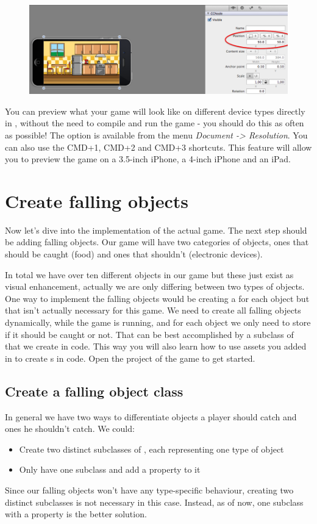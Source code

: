 \begin{figure}[H]
		\centering
		\includegraphics[width=0.9\linewidth]{images/Chapter2/center_background.png}
\end{figure}

You can preview what your game will look like on different device types directly
in \SB{}, without the need to compile and run the game - you should do this as
often as possible! The option is available from the menu \textit{Document ->
Resolution}. You can also use the CMD+1, CMD+2 and CMD+3 shortcuts. This feature
will allow you to preview the game on a 3.5-inch iPhone, a 4-inch iPhone and an
iPad.

\section{Create falling objects}
Now let's dive into the implementation of the actual game. The next step should
be adding falling objects. Our game will have two categories of objects, ones
that should be caught (food) and ones that shouldn't (electronic devices).

In total we have over ten different objects in our game but these just exist as
visual enhancement, actually we are only differing between two types of objects.
One way to implement the falling objects would be creating a \ccbfile{} for each
object but that isn't actually necessary for this game. We need to create all
falling objects dynamically, while the game is running, and for each object we
only need to store if it should be caught or not. That can be best accomplished
by a subclass of \ccsprite{} that we create in code. This way you will also
learn how to use assets you added in \SB{} to create \ccsprite{}s in code.
Open the \xcode{} project of the game to get started.

\subsection{Create a falling object class}
In general we have two ways to differentiate objects a player should catch and
ones he shouldn't catch. We could:
\begin{itemize}
  \item Create two distinct subclasses of \ccsprite{}, each representing one
  type of object
  \item Only have one subclass and add a  property to it
\end{itemize}
Since our falling objects won't have any type-specific behaviour, creating two
distinct subclasses is not necessary in this case. Instead, as of now, one
subclass with a  property is the better solution.

